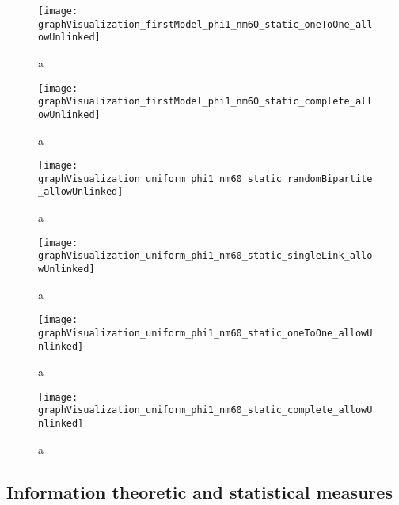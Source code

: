 \begin{figure}
  \centering
  \texttt{[image: graphVisualization\_firstModel\_phi1\_nm60\_static\_oneToOne\_allowUnlinked]}
  \caption{a}
  \label{fig:graphVisualization_firstModel_phi1_nm60_static_oneToOne_allowUnlinked}
\end{figure}

\begin{figure}
  \centering
  \texttt{[image: graphVisualization\_firstModel\_phi1\_nm60\_static\_complete\_allowUnlinked]}
  \caption{a}
  \label{fig:graphVisualization_firstModel_phi1_nm60_static_complete_allowUnlinked}
\end{figure}

\begin{figure}
  \centering
  \texttt{[image: graphVisualization\_uniform\_phi1\_nm60\_static\_randomBipartite\_allowUnlinked]}
  \caption{a}
  \label{fig:graphVisualization_uniform_phi1_nm60_static_randomBipartite_allowUnlinked}
\end{figure}

\begin{figure}
  \centering
  \texttt{[image: graphVisualization\_uniform\_phi1\_nm60\_static\_singleLink\_allowUnlinked]}
  \caption{a}
  \label{fig:graphVisualization_uniform_phi1_nm60_static_singleLink_allowUnlinked}
\end{figure}

\begin{figure}
  \centering
  \texttt{[image: graphVisualization\_uniform\_phi1\_nm60\_static\_oneToOne\_allowUnlinked]}
  \caption{a}
  \label{fig:graphVisualization_uniform_phi1_nm60_static_oneToOne_allowUnlinked}
\end{figure}

\begin{figure}
  \centering
  \texttt{[image: graphVisualization\_uniform\_phi1\_nm60\_static\_complete\_allowUnlinked]}
  \caption{a}
  \label{fig:graphVisualization_uniform_phi1_nm60_static_complete_allowUnlinked}
\end{figure}


\subsection{Information theoretic and statistical measures}
\label{sec:results_new_other}

